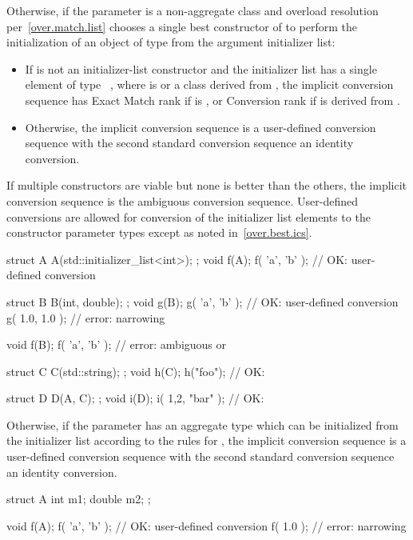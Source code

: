 \pnum
Otherwise, if the parameter is a non-aggregate class  and overload
resolution per~\ref{over.match.list} chooses a single best constructor  of
 to perform the initialization of an object of type  from the
argument initializer list:
\begin{itemize}
\item
If  is not an initializer-list constructor
and the initializer list has a single element of type \cv{}~,
where  is  or a class derived from ,
the implicit conversion sequence has Exact Match rank if  is ,
or Conversion rank if  is derived from .
\item
Otherwise, the implicit conversion sequence is a user-defined
conversion sequence with the second standard conversion sequence an
identity conversion.
\end{itemize}
If multiple constructors are viable but none is better than
the others, the implicit conversion sequence is the ambiguous conversion
sequence. User-defined conversions are allowed for conversion of the initializer
list elements to the constructor parameter types except as noted
in~\ref{over.best.ics}.
\begin{example}
\begin{codeblock}
struct A {
  A(std::initializer_list<int>);
};
void f(A);
f( {'a', 'b'} );        // OK:  user-defined conversion

struct B {
  B(int, double);
};
void g(B);
g( {'a', 'b'} );        // OK:  user-defined conversion
g( {1.0, 1.0} );        // error: narrowing

void f(B);
f( {'a', 'b'} );        // error: ambiguous  or 

struct C {
  C(std::string);
};
void h(C);
h({"foo"});             // OK: 

struct D {
  D(A, C);
};
void i(D);
i({ {1,2}, {"bar"} });  // OK: 
\end{codeblock}
\end{example}

\pnum
Otherwise, if the parameter has an aggregate type which can be initialized from
the initializer list according to the rules for , the implicit conversion sequence is a
user-defined conversion sequence with the second standard conversion
sequence an identity conversion.
\begin{example}
\begin{codeblock}
struct A {
  int m1;
  double m2;
};

void f(A);
f( {'a', 'b'} );        // OK:  user-defined conversion
f( {1.0} );             // error: narrowing
\end{codeblock}
\end{example}

